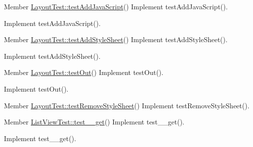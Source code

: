 \label{todo__todo000231}
\hypertarget{todo__todo000231}{}
 
\begin{DoxyDescription}
\item[Member \hyperlink{class_layout_test_a97e6be8c99105e4d625ce769f8b085f6}{LayoutTest::testAddJavaScript}() ]Implement testAddJavaScript().

Implement testAddJavaScript().
\end{DoxyDescription}

\label{todo__todo000232}
\hypertarget{todo__todo000232}{}
 
\begin{DoxyDescription}
\item[Member \hyperlink{class_layout_test_a29b2b3ffe02987ea2e2ce21f76d78017}{LayoutTest::testAddStyleSheet}() ]Implement testAddStyleSheet().

Implement testAddStyleSheet().
\end{DoxyDescription}

\label{todo__todo000233}
\hypertarget{todo__todo000233}{}
 
\begin{DoxyDescription}
\item[Member \hyperlink{class_layout_test_a67660aeb09b1e64607050a3ad183486d}{LayoutTest::testOut}() ]Implement testOut().

Implement testOut().
\end{DoxyDescription}

\label{todo__todo000380}
\hypertarget{todo__todo000380}{}
 
\begin{DoxyDescription}
\item[Member \hyperlink{class_layout_test_a1bc55dddf6f3e6c99000f2c0b157671a}{LayoutTest::testRemoveStyleSheet}() ]Implement testRemoveStyleSheet().
\end{DoxyDescription}

\label{todo__todo000148}
\hypertarget{todo__todo000148}{}
 
\begin{DoxyDescription}
\item[Member \hyperlink{class_list_view_test_aa66b76414526d7fcf38a3afca490388f}{ListViewTest::test\_\-\_\-get}() ]Implement test\_\-\_\-get().

Implement test\_\-\_\-get().
\end{DoxyDescription}

\label{todo__todo000147}
\hypertarget{todo__todo000147}{}
 
